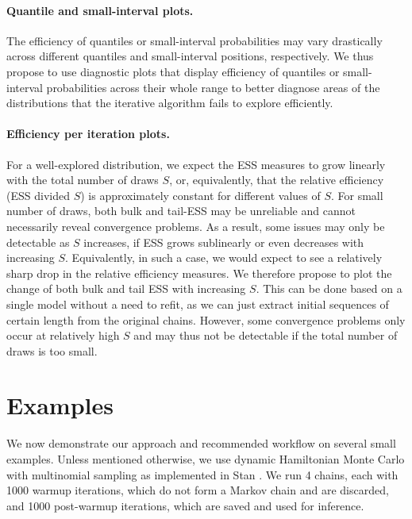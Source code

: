 \documentclass[american,]{article}
\let\oldparagraph\paragraph
\renewcommand{\paragraph}[1]{\oldparagraph{#1}\mbox{}}
\theoremstyle{definition}
\begin{document}
\hypertarget{quantile-and-small-interval-plots}{%
\paragraph{Quantile and small-interval
plots.}\label{quantile-and-small-interval-plots}}
The efficiency of quantiles or small-interval probabilities may vary
drastically across different quantiles and small-interval positions,
respectively. We thus propose to use diagnostic plots that display
efficiency of quantiles or small-interval probabilities across their
whole range to better diagnose areas of the distributions that the
iterative algorithm fails to explore efficiently.

\hypertarget{efficiency-change-plots}{%
\paragraph{Efficiency per iteration plots.}\label{efficiency-change-plots}}
For a well-explored distribution, we expect the ESS measures to grow
linearly with the total number of draws \(S\), or, equivalently, that
the relative efficiency (ESS divided \(S\)) is approximately constant
for different values of \(S\). For small number of draws, both bulk and
tail-ESS may be unreliable and cannot necessarily reveal convergence
problems. As a result, some issues may only be
detectable as \(S\) increases, if ESS grows sublinearly
or even decreases with increasing \(S\). Equivalently, in
such a case, we would expect to see a relatively sharp drop in the
relative efficiency measures. We therefore propose to plot the change of
both bulk and tail ESS with increasing \(S\). This can be done based on
a single model without a need to refit, as we can just extract initial
sequences of certain length from the original chains. However, some
convergence problems only occur at relatively high
\(S\) and may thus not be detectable if the total number of draws is too
small.

\hypertarget{examples}{%
\section{Examples}\label{examples}}

We now demonstrate our approach and recommended workflow on several small examples.
Unless mentioned otherwise, we use dynamic Hamiltonian Monte Carlo with
multinomial sampling \citep{betancourt2017conceptual} as implemented
in Stan \citep{StanManual.2.18.0}. We run 4 chains, each with 1000
warmup iterations, which do not form a Markov chain and are discarded, and
1000 post-warmup iterations, which are saved and used for inference.
\end{document}
